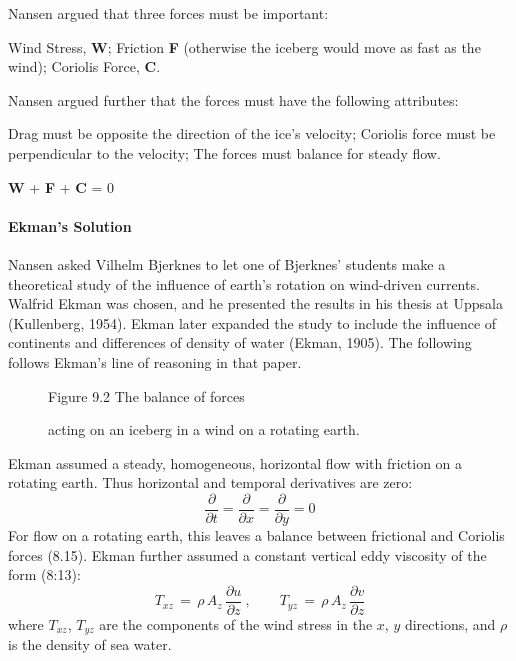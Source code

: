Nansen argued that three forces must be important:
\begin{enumerate}
\vitem Wind Stress, \textbf{W};
\vitem Friction \textbf{F} (otherwise the iceberg would move as fast as the wind);
\vitem Coriolis Force, \textbf{C}.
\end{enumerate}
Nansen argued further that the forces must have the following attributes:
\begin{enumerate}
\vitem Drag must be opposite the direction of the ice's velocity;
\vitem Coriolis force must be perpendicular to the velocity;
\vitem The forces must balance for steady flow.
\end{enumerate}
\begin{center}
\textbf{W} + \textbf{F} + \textbf{C} = 0
\end{center}

\paragraph{Ekman's Solution}
Nansen asked Vilhelm Bjerknes to let one of Bjerknes'
students make a theoretical study of the influence of earth's rotation on wind-driven
currents. Walfrid Ekman was chosen, and he presented the results in his thesis at
Uppsala (Kullenberg, 1954). Ekman later expanded the study to include the influence of continents and
differences of density of water (Ekman, 1905). The following follows Ekman's line of
reasoning  in that paper.

\begin{figure}[t!]
\centering
{}
\footnotesize
Figure 9.2 The balance of forces \rule{0mm}{3ex}acting on an iceberg
in a wind on a rotating earth.

\label{fig:forcesketch}
\vspace{-3ex}
\end{figure}

Ekman assumed a steady, homogeneous, horizontal
flow with friction on a rotating earth. Thus horizontal and temporal derivatives are
zero:
\begin{equation}
\frac{\partial}{\partial{t}}=\frac{\partial}{\partial{x}}=\frac{\partial}{\partial{y}}=0
\end{equation}
For flow on a rotating earth, this leaves a balance between frictional and Coriolis forces (8.15).
Ekman further assumed a constant vertical eddy viscosity of the form (8:13):
\begin{equation}
T_{xz} \,=\,\rho\, A_z \,\frac{\partial{u}}{\partial{z}}\: , \qquad T_{yz}\,=\,\rho\, A_z \,\frac{\partial{v}}{\partial{z}}
\end{equation}
where $T_{xz}$, $T_{yz}$ are the components of the wind stress in
the
$x$,
$y$ directions, and $\rho$ is the density of sea water.

